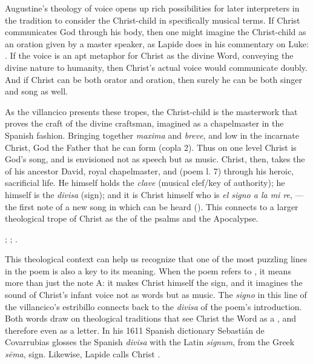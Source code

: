 Augustine's theology of voice opens up rich possibilities for later interpreters
in the tradition to consider the Christ-child in specifically musical terms.
If Christ communicates God through his body, then one might imagine the
Christ-child as an oration given by a master speaker, as Lapide does in his
commentary on Luke:
.%
    \Autocite[673, on ]{Lapide:Gospels19C} 
If the voice is an apt metaphor for Christ as the divine Word, conveying the
divine nature to humanity, then Christ's actual voice would communicate doubly.
And if Christ can be both orator and oration, then surely he can be both singer
and song as well.

As the villancico  presents these tropes, the
Christ-child is the masterwork that proves the craft of the divine craftsman,
imagined as a chapelmaster in the Spanish fashion.
Bringing together \emph{maxima} and \emph{breve},  and low in the
incarnate Christ, God the Father  that he can form
 (copla 2).
Thus on one level Christ is God's song, and  is envisioned not
as speech but as music.
Christ, then, takes the  of his ancestor David, royal
chapelmaster, and  (poem l. 7) through his heroic,
sacrificial life.
He himself holds the \emph{clave} (musical clef/key of authority); he himself is
the \emph{divisa} (sign); and it is Christ himself who is \emph{el signo a la mi
re}, ---the first note of a new song in which can be heard
 ().
This connects to a larger theological trope of Christ as the 
of the psalms and the Apocalypse.%
\begin{Footnote}
    ; ;
    .
\end{Footnote}

This theological context can help us recognize that one of the most puzzling
lines in the poem is also a key to its meaning. 
When the poem refers to , it means
more than just the note A: it makes Christ himself the sign, and it imagines
the sound of Christ's infant voice not as words but as music. 
The \emph{signo} in this line of the villancico's estribillo connects back to
the \emph{divisa} of the poem's introduction.
Both words draw on theological traditions that see Christ the Word as a
, and therefore even as a letter.
In his 1611 Spanish dictionary Sebastián de Covarrubias glosses the Spanish
\emph{divisa} with the Latin \emph{signum}, from the Greek \emph{sēma}, sign. 
Likewise, Lapide calls Christ .%
    \Autocites
    []{Covarrubias:Tesoro}
    [685--686, on Lk 2]{Lapide:Gospels19C} %

